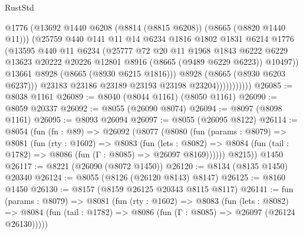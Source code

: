 \begin{lexlean}{RustStd}
\begin{coremodule}
                            @1776
                            (@13692 @1440 @6208 (@8814 (@8815 @6208)) (@8665 (@8820 @1440 @11)))
                            (@25759
                              @440
                              @141
                              @11
                              @14
                              @6234
                              @1816
                              @1802
                              @1831
                              @6214
                              @1776
                              (@13595
                                @440
                                @11
                                @6234
                                (@25777
                                  @72
                                  @20
                                  @11
                                  @1968
                                  @1843
                                  @6222
                                  @6229
                                  @13623
                                  @20222
                                  @20226
                                  @12801
                                  @8916
                                  (@8665 (@9489 @6229 @6223))
                                  @10497))
                              @13661
                              @8928
                              (@8665 (@8930 @6215 @1816)))
                            @8928
                            (@8665 (@8930 @6203 @6237)))
                          @23183
                          @23186
                          @23189
                          @23193
                          @23198
                          @23204)))))))))))
@26085 := @8038 @1161
@26089 := @8040 (@8044 @1161) (@8050 @1161)
@26090 := @8059 @20337
@26092 := @8055 (@26090 @8074)
@26094 := @8097 (@8098 @1161)
@26095 := @8093 @26094
@26097 := @8055 (@26095 @8122)
@26114 := @8054
    (fun (fn : @89) =>
    @26092
      (@8077
        (@8080
          (fun (params : @8079) =>
          @8081
            (fun (rty : @1602) =>
            @8083
              (fun (lets : @8082) =>
              @8084 (fun (tail : @1782) => @8086 (fun (Γ : @8085) => @26097 @8169))))))
        @8215))
    @1450
@26117 := @8221 (@26090 (@8072 @1450))
@26120 := @8134 (@8135 @1450) @20340
@26124 := @8055 (@8126 (@26120 @8143) @8147)
@26125 := @8160 @1450
@26130 := @8157 (@8159 @26125 @20343 @8115 @8117)
@26141 := fun (params : @8079) =>
  @8081
    (fun (rty : @1602) =>
    @8083
      (fun (lets : @8082) =>
      @8084 (fun (tail : @1782) => @8086 (fun (Γ : @8085) => @26097 (@26124 @26130)))))

\end{coremodule}
\end{lexlean}
